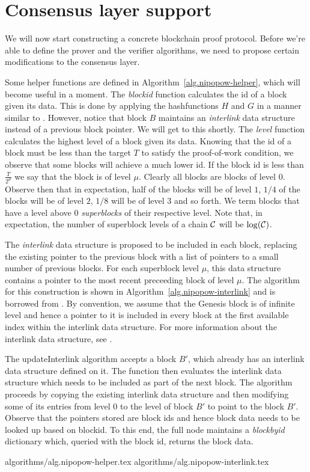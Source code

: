\section{Consensus layer support}

We will now start constructing a concrete blockchain proof protocol. Before
we're able to define the prover and the verifier algorithms, we need to propose
certain modifications to the consensus layer.

Some helper functions are defined in Algorithm~\ref{alg.nipopow-helper}, which
will become useful in a moment. The \textit{blockid} function calculates the
id of a block given its data. This is done by applying the hashfunctions $H$
and $G$ in a manner similar to \cite{backbone}. However, notice that block $B$
maintains an \textit{interlink} data structure instead of a previous block
pointer. We will get to this shortly. The \textit{level} function calculates
the highest level of a block given its data. Knowing that the id of a block
must be less than the target $T$ to satisfy the proof-of-work condition, we
observe that some blocks will achieve a much lower id. If the block id is less
than $\frac{T}{2^\mu}$ we say that the block is of level $\mu$. Clearly all
blocks are blocks of level $0$. Observe then that in expectation, half of the
blocks will be of level $1$, $1/4$ of the blocks will be of level $2$, $1/8$
will be of level $3$ and so forth. We term blocks that have a level above 0
\textit{superblocks} of their respective level. Note that, in expectation, the
number of superblock levels of a chain $\mathcal{C}$ will be $\log(\mathcal{C})$.

The \textit{interlink} data structure is proposed to be included in each block,
replacing the existing pointer to the previous block with a list of pointers to
a small number of previous blocks. For each superblock level $\mu$, this data
structure contains a pointer to the most recent preceeding block of level
$\mu$. The algorithm for this construction is shown in
Algorithm~\ref{alg.nipopow-interlink} and is borrowed from \cite{KLS}. By
convention, we assume that the Genesis block is of infinite level and hence a
pointer to it is included in every block at the first available index within
the interlink data structure. For more information about the interlink data
structure, see \cite{KLS}.

The updateInterlink algorithm accepts a block $B'$, which already has an
interlink data structure defined on it. The function then evaluates the
interlink data structure which needs to be included as part of the next block.
The algorithm proceeds by copying the existing interlink data structure and
then modifying some of its entries from level $0$ to the level of block $B'$ to
point to the block $B'$. Observe that the pointers stored are block ids and
hence block data needs to be looked up based on blockid. To this end, the full
node maintains a \textit{blockbyid} dictionary which, queried with the block
id, returns the block data.

{algorithms/alg.nipopow-helper.tex}
{algorithms/alg.nipopow-interlink.tex}
